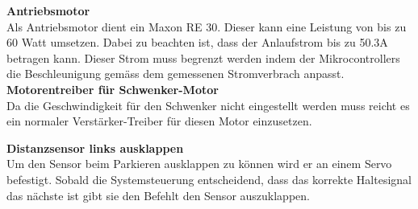 \documentclass[../../main.tex]{subfiles}
\begin{document}
    \textbf{Antriebsmotor}\\
    Als Antriebsmotor dient ein Maxon RE 30. Dieser kann eine Leistung von bis zu 60 Watt umsetzen. Dabei zu beachten ist, dass der Anlaufstrom bis zu 50.3A betragen kann. Dieser Strom muss begrenzt werden indem der Mikrocontrollers die Beschleunigung gemäss dem gemessenen Stromverbrach anpasst.\\ %

    \textbf{Motorentreiber für Schwenker-Motor}\\
    Da die Geschwindigkeit für den Schwenker nicht eingestellt werden muss reicht es ein normaler Verstärker-Treiber für diesen Motor einzusetzen.

    \textbf{Distanzsensor links ausklappen}\\
    Um den Sensor beim Parkieren ausklappen zu können wird er an einem Servo befestigt. Sobald die Systemsteuerung entscheidend, dass das korrekte Haltesignal das nächste ist gibt sie den Befehlt den Sensor auszuklappen. \\

    
\end{document}

